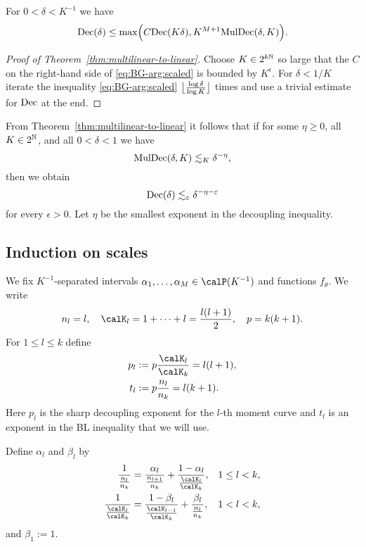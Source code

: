 \begin{corollary}
\label{cor:bourgain-guth-arg:scaled}
For $0 < \delta < K^{-1}$ we have
\begin{equation}
\label{eq:BG-arg:scaled}
\Dec(\delta)
\leq \max\Bigl( C \Dec(K \delta), K^{M+1} \MulDec(\delta, K) \Bigr).
\end{equation}
\end{corollary}

\begin{proof}[Proof of Theorem~\ref{thm:multilinear-to-linear}]
Choose $K \in 2^{k\N}$ so large that the $C$ on the right-hand side of \eqref{eq:BG-arg:scaled} is bounded by $K^{\epsilon}$.
For $\delta < 1/K$ iterate the inequality \eqref{eq:BG-arg:scaled} $\floor[\big]{\frac{\log \delta}{\log K}}$ times and use a trivial estimate for $\Dec$ at the end.
\end{proof}

From Theorem~\ref{thm:multilinear-to-linear} it follows that if for some $\eta \geq 0$, all $K\in 2^{\N}$, and all $0 < \delta < 1$ we have
\begin{equation}
\label{eq:multlin-dec-power}
\MulDec(\delta, K)
\lesssim_{K}
\delta^{-\eta},
\end{equation}
then we obtain
\begin{equation}
\label{eq:lin-dec-power-iteration}
\Dec(\delta)
\lesssim_{\epsilon}
\delta^{-\eta - \epsilon}
\end{equation}
for every $\epsilon>0$.
Let $\eta$ be the smallest exponent in the decoupling inequality.

\subsection{Induction on scales}
\label{sec:induction-on-scales}
We fix $K^{-1}$-separated intervals $\alpha_{1},\dotsc,\alpha_{M} \in \Part{K^{-1}}$ and functions $f_{\theta}$.
We write
\[
n_{l} = l,
\quad
\calK_{l} = 1+\dotsb+l = \frac{l(l+1)}{2},
\quad
p = k(k+1).
\]
For $1 \leq l \leq k$ define
\begin{align*}
p_{l} &:= p \frac{\calK_{l}}{\calK_{k}} = l(l+1),\\
t_{l} &:= p \frac{n_{l}}{n_{k}} = l(k+1).
\end{align*}
Here $p_{l}$ is the sharp decoupling exponent for the $l$-th moment curve and $t_{l}$ is an exponent in the BL inequality that we will use.

Define $\alpha_l$ and $\beta_l$ by
\begin{align}
\label{eq:alpha}
\frac{1}{\frac{n_{l}}{n_{k}}}
&=
\frac{\alpha_l}{\frac{n_{l+1}}{n_{k}}}+\frac{1-\alpha_l}{\frac{\calK_{l}}{\calK_{k}}},
& 1 \leq l < k,\\
\label{eq:beta}
\frac{1}{\frac{\calK_{l}}{\calK_{k}}}
&=
\frac{1-\beta_l}{\frac{\calK_{l-1}}{\calK_{k}}}+\frac{\beta_l}{\frac{n_{l}}{n_{k}}},
& 1 < l < k,
\end{align}
and $\beta_{1}:=1$.

